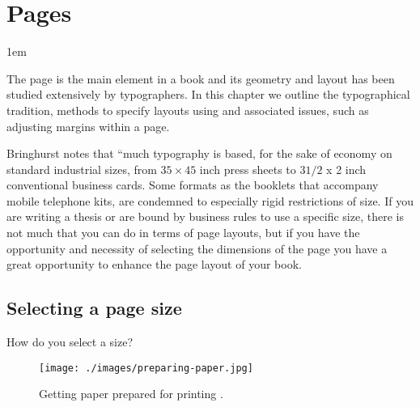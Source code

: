 \makeatletter
\newenvironment{adjustmargins}[2]{%
 \begin{list}{}{%
 \topsep\z@%
 \listparindent\parindent%
 \parsep\parskip%
 \checkoddpage
 \ifoddpage %
 \@ifmtarg{#1}{\setlength{\leftmargin}{\z@}}%
 {\setlength{\leftmargin}{#1}}%
 \@ifmtarg{#2}{\setlength{\rightmargin}{\z@}}%
 {\setlength{\rightmargin}{#2}}%
 \else %
 \@ifmtarg{#2}{\setlength{\leftmargin}{\z@}}%
 {\setlength{\leftmargin}{#2}}%
 \@ifmtarg{#1}{\setlength{\rightmargin}{\z@}}%
 {\setlength{\rightmargin}{#1}}%
\fi
}
\item[]}{\end{list}}

\makeatother
\chapter{Pages}

\parindent1em

The page is the main element in a book and its geometry and layout has been studied extensively by typographers. In this chapter we outline the typographical tradition, methods to specify layouts using \latex and associated issues, such as adjusting margins within a page.

Bringhurst notes that ``much typography is based, for the sake of economy on standard industrial sizes, from $35\times45$ inch press sheets to $3 1/2$ x 2 inch conventional business cards. Some formats as the booklets that accompany mobile telephone kits, are condemned to especially rigid restrictions of size.  If you are writing a thesis or are bound by business rules to use a specific size, there is not much that you can do in terms of page layouts, but if you have the opportunity and necessity of selecting the dimensions of the page you have a great opportunity to enhance the page layout of your book.

\section{Selecting a page size}

How do you select a size? 


{\large{}}


\begin{figure}[ht]
\centering
\texttt{[image: ./images/preparing-paper.jpg]}
\caption{Getting paper prepared for printing \citep{moxon}.}
\end{figure}

